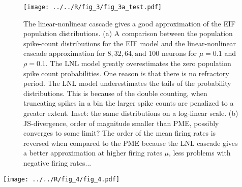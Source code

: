 \documentclass[%
 reprint,
 amsmath,amssymb,
 aps,
floatfix,
]{revtex4-1}
\begin{document}
\begin{figure}[h]
\texttt{[image: ../../R/fig\_3/fig\_3a\_test.pdf]}
\caption{\label{fig:eiffilter} The linear-nonlinear cascade gives a good approximation of the EIF population distributions. (a) A comparison between the population spike-count distributions for the EIF model and the linear-nonlinear cascade approximation for $8, 32, 64, \text{and } 100$ neurons for $\mu = 0.1$ and $\rho = 0.1$. The LNL model greatly overestimates the zero population spike count probabilities. One reason is that there is no refractory period. The LNL model underestimates the tails of the probability distributions. This is because of the double counting, when truncating spikes in a bin the larger spike counts are penalized to a greater extent. Inset: the same distributions on a log-linear scale. (b) JS-divergence, order of magnitude smaller than PME, possibly converges to some limit? The order of the mean firing rates is reversed when compared to the PME because the LNL cascade gives a better approximation at higher firing rates $\mu$, less problems with negative firing rates...}
\end{figure}


\begin{figure*}
\texttt{[image: ../../R/fig\_4/fig\_4.pdf]}
\caption{\label{fig:lnldgcomp} (a) The Dichotomized Gaussian (DG) model gives an excellent description of the exponential integrate-and-fire (EIF) population spike count probability distributions across a range of correlation coefficient values. The two models are plotted on top of one another and appear as a single curve for each value of $\rho$. (b) Comparing the $L(s)$ function for the DG and the $\tilde{L}(s)$ function for the EIF (after transforming from the EIF probability density function for the variable $\mathcal{S}$ to the DG variable $s$. The functions agree to an extent over the pdf $\phi_DG$ of the DG model. The DG function $L(s)$ tends to $0$ for negative values of $s$ where the LNL function $\tilde{L}(s)$ tends to a finite non-zero value. This agrees with the probability distributions in the previous model where the LNL cascade is less accurate at estimating the $0$-population spike count and large population spike count probabilities. (c) The heat capacity increases linearly for the LNL-cascade, the EIF and the DG. For the case of the LNL cascade the heat capacity increases at a slightly greater rate than the EIF/DG which overlap. The Ising model saturates for a population of approximately $N=30$ neurons.}
\end{figure*}
\end{document}
